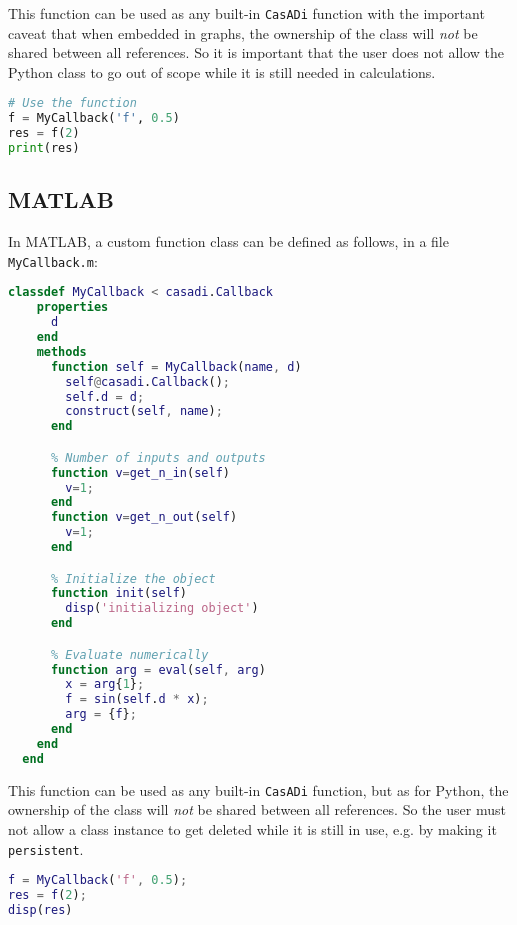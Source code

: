 \documentclass[a4paper,12pt]{book}
\newcommand{\CasADi}{\texttt{CasADi}\xspace}
\begin{document}
This function can be used as any built-in \CasADi function with the important
caveat that when embedded in graphs, the ownership of the class will \emph{not}
be shared between all references. So it is important that the user does not
allow the Python class to go out of scope while it is still needed in
calculations.

\begin{lstlisting}[language=Python]
# Use the function
f = MyCallback('f', 0.5)
res = f(2)
print(res)
\end{lstlisting}

\subsection*{MATLAB}
In MATLAB, a custom function class can be defined as follows, in a file
\verb|MyCallback.m|:

\begin{lstlisting}[language=Matlab]
  classdef MyCallback < casadi.Callback
    properties
      d
    end
    methods
      function self = MyCallback(name, d)
        self@casadi.Callback();
        self.d = d;
        construct(self, name);
      end

      % Number of inputs and outputs
      function v=get_n_in(self)
        v=1;
      end
      function v=get_n_out(self)
        v=1;
      end

      % Initialize the object
      function init(self)
        disp('initializing object')
      end

      % Evaluate numerically
      function arg = eval(self, arg)
        x = arg{1};
        f = sin(self.d * x);
        arg = {f};
      end
    end
  end
\end{lstlisting}

This function can be used as any built-in \CasADi function, but as for Python,
the ownership of the class will \emph{not} be shared between all references.
So the user must not allow a class instance to get deleted while it is still
in use, e.g. by making it \texttt{persistent}.

\begin{lstlisting}[language=Matlab]
% Use the function
f = MyCallback('f', 0.5);
res = f(2);
disp(res)
\end{lstlisting}
\end{document}
